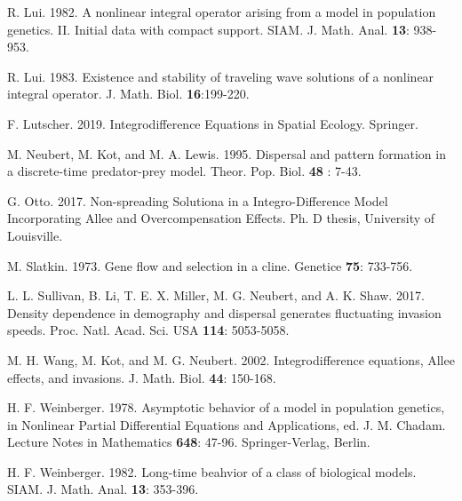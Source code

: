 \documentclass[11pt]{article}
\numberwithin{equation}{section}
\theoremstyle{definition}
\begin{document}
\begin{thebibliography}{9}
 R. Lui. 1982. A nonlinear integral operator arising from a model in population
genetics. II. Initial data with compact support. SIAM. J. Math.
Anal. {\bf 13}: 938-953.

 R. Lui. 1983. Existence and stability of traveling wave solutions of a nonlinear
integral operator. J. Math. Biol. {\bf 16}:199-220.

F. Lutscher. 2019. Integrodifference Equations in Spatial Ecology.  Springer.


 M. Neubert, M. Kot, and M. A. Lewis. 1995. Dispersal and pattern formation in a
discrete-time predator-prey model. Theor. Pop. Biol. {\bf 48}
: 7-43.

 G. Otto. 2017. Non-spreading Solutiona in a Integro-Difference Model Incorporating Allee and Overcompensation Effects. Ph. D thesis, University of Louisville.

 M. Slatkin. 1973. Gene flow and selection in a cline.
Genetice {\bf 75}: 733-756.



 L. L. Sullivan, B. Li, T. E. X. Miller, M. G. Neubert, and A. K. Shaw. 2017.
Density dependence in demography and dispersal generates fluctuating invasion speeds. Proc. Natl. Acad. Sci. USA {\bf
114}: 5053-5058.


 M. H. Wang, M. Kot, and M. G. Neubert. 2002. Integrodifference equations, Allee effects, and
invasions. J. Math. Biol. {\bf 44}: 150-168.

 H. F. Weinberger. 1978. Asymptotic behavior of a model in  population genetics,
in Nonlinear Partial Differential Equations  and Applications, ed.
J. M. Chadam. Lecture Notes in Mathematics {\bf 648}: 47-96.
Springer-Verlag, Berlin.

 H. F.  Weinberger. 1982. Long-time beahvior of a class of biological models. SIAM. J.
Math. Anal. {\bf 13}: 353-396.

\end{thebibliography}
\end{document}
